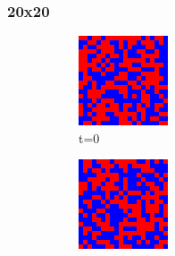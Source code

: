 \documentclass[a4paper, 11pt]{article}
\begin{document}
\subsubsection{20x20}
\begin{figure}[H]
\centering
\begin{subfigure}{.25\textwidth}
  \centering
  \includegraphics[width=0.9\linewidth]{SNOWDRIFT_MOORE_20x20_t00}
  \caption{t=0}
\end{subfigure}%
\begin{subfigure}{.25\textwidth}
  \centering
  \includegraphics[width=0.9\linewidth]{SNOWDRIFT_MOORE_20x20_t01}

\end{subfigure}
\end{figure}
\end{document}
